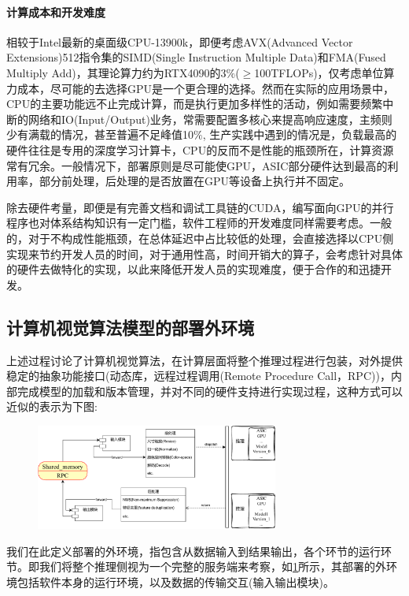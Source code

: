 \documentclass[master]{shtthesis}
\begin{document}
\paragraph{计算成本和开发难度}
相较于Intel最新的桌面级CPU-13900k，即便考虑AVX(Advanced Vector Extensions)512指令集的SIMD(Single Instruction Multiple Data)和FMA(Fused Multiply Add)，其理论算力约为RTX4090的3$\%$($\geq$100TFLOPs)，仅考虑单位算力成本，尽可能的去选择GPU是一个更合理的选择。然而在实际的应用场景中，CPU的主要功能远不止完成计算，而是执行更加多样性的活动，例如需要频繁中断的网络和IO(Input/Output)业务，常需要配置多核心来提高响应速度，主频则少有满载的情况，甚至普遍不足峰值10$\%$, 生产实践中遇到的情况是，负载最高的硬件往往是专用的深度学习计算卡，CPU的反而不是性能的瓶颈所在，计算资源常有冗余。一般情况下，部署原则是尽可能使GPU，ASIC部分硬件达到最高的利用率，部分前处理，后处理的是否放置在GPU等设备上执行并不固定。

除去硬件考量，即便是有完善文档和调试工具链的CUDA，编写面向GPU的并行程序也对体系结构知识有一定门槛，软件工程师的开发难度同样需要考虑。一般的，对于不构成性能瓶颈，在总体延迟中占比较低的处理，会直接选择以CPU侧实现来节约开发人员的时间，对于通用性高，时间开销大的算子，会考虑针对具体的硬件去做特化的实现，以此来降低开发人员的实现难度，便于合作的和迅捷开发。

\subsection{计算机视觉算法模型的部署外环境}\label{计算机视觉算法模型的部署外环境}
上述过程讨论了计算机视觉算法，在计算层面将整个推理过程进行包装，对外提供稳定的抽象功能接口(动态库，远程过程调用(Remote Procedure Call，RPC))，内部完成模型的加载和版本管理，并对不同的硬件支持进行实现过程，这种方式可以近似的表示为下图:

\begin{figure}[htbp]
	\centering
	\includegraphics[width=8cm]{img/frame.pdf}
	\label{计算机视觉算法部署框架}
\end{figure}

我们在此定义部署的外环境，指包含从数据输入到结果输出，各个环节的运行环节。即我们将整个推理侧视为一个完整的服务端来考察，如\ref{计算机视觉算法部署框架}所示，其部署的外环境包括软件本身的运行环境，以及数据的传输交互(输入输出模块)。
\end{document}
